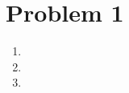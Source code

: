 \documentclass[12pt]{article}
\begin{document}
\section*{Problem 1}
\begin{enumerate}
    \item %
    \item %
    \item %
\end{enumerate}
\end{document}
